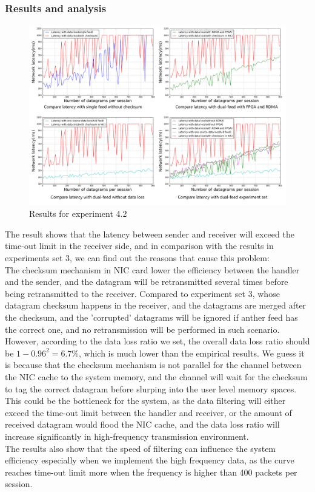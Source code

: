 \documentclass[11pt,openright,a4paper]{report}
\begin{document}
\subsubsection{Results and analysis}
\begin{figure}[H]
\centering
\includegraphics[width=1.0\linewidth]{./picture/experiments/exp4/dataLoss_compare.jpg}
\caption{Results for experiment 4.2}
\label{fig:dataLoss_compare}
\end{figure}
The result shows that the latency between sender and receiver will exceed the time-out limit in the receiver side, and in comparison with the results in experiments set 3, we can find out the reasons that cause this problem:\\
The checksum mechanism in NIC card lower the efficiency between the handler and the sender, and the datagram will be retransmitted several times before being retransmitted to the receiver. Compared to experiment set 3, whose datagram checksum happens in the receiver, and the datagrams are merged after the checksum, and the 'corrupted' datagrams will be ignored if anther feed has the correct one, and no retransmission will be performed in such scenario.\\
However, according to the data loss ratio we set, the overall data loss ratio should be $1-0.96^{2}=6.7\%$, which is much lower than the empirical results. We guess it is because that the checksum mechanism is not parallel for the channel between the NIC cache to the system memory, and the channel will wait for the checksum to tag the correct datagram before slurping into the user level memory spaces. This could be the bottleneck for the system, as the data filtering will either exceed the time-out limit between the handler and receiver, or the amount of received datagram would flood the NIC cache, and the data loss ratio will increase significantly in high-frequency transmission environment.\\
The results also show that the speed of filtering can influence the system efficiency especially when we implement the high frequency data, as the curve reaches time-out limit more when the frequency is higher than 400 packets per session.\\
\end{document}
